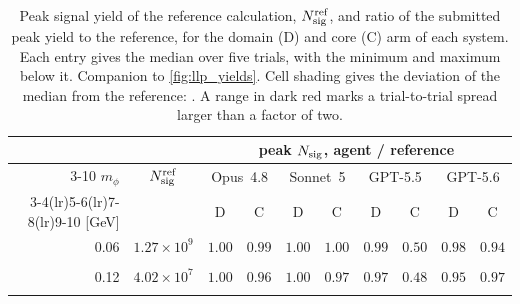 \begin{table}[H]
\centering
\small
\setlength{\tabcolsep}{3pt}
\caption{Peak signal yield of the reference calculation, $N_{\rm sig}^{\rm ref}$, and ratio of the submitted peak yield to the reference, for the domain (D) and core (C) arm of each system. Each entry gives the median over five trials, with the minimum and maximum below it. Companion to \cref{fig:llp_yields}. Cell shading gives the deviation of the median from the reference: \protect\llpkey. A range in dark red marks a trial-to-trial spread larger than a factor of two.}
\label{tab:llp_yields}
\begin{tabular}{rc*{8}{c}}
\toprule
& & \multicolumn{8}{c}{peak $N_{\rm sig}$, agent / reference} \\
\cmidrule(lr){3-10}
$m_\phi$ & $N_{\rm sig}^{\rm ref}$ & \multicolumn{2}{c}{Opus~4.8} & \multicolumn{2}{c}{Sonnet~5} & \multicolumn{2}{c}{GPT-5.5} & \multicolumn{2}{c}{GPT-5.6} \\
\cmidrule(lr){3-4}\cmidrule(lr){5-6}\cmidrule(lr){7-8}\cmidrule(lr){9-10}
[GeV] & & D & C & D & C & D & C & D & C \\
\midrule
0.06 & $1.27\times10^{9}$ & \cellcolor{llpA}$1.00$ & \cellcolor{llpA}$0.99$ & \cellcolor{llpA}$1.00$ & \cellcolor{llpA}$1.00$ & \cellcolor{llpA}$0.99$ & \cellcolor{llpD}$0.50$ & \cellcolor{llpA}$0.98$ & \cellcolor{llpB}$0.94$ \\
& & \cellcolor{llpA}{\scriptsize$[0.98,\,1.01]$} & \cellcolor{llpA}{\color{llpSpread}{\scriptsize$[0.98,\,56]$}} & \cellcolor{llpA}{\scriptsize$[0.89,\,1.00]$} & \cellcolor{llpA}{\color{llpSpread}{\scriptsize$[0.18,\,1.33]$}} & \cellcolor{llpA}{\scriptsize$[0.98,\,1.01]$} & \cellcolor{llpD}{\color{llpSpread}{\scriptsize$[0.0047,\,22]$}} & \cellcolor{llpA}{\scriptsize$[0.96,\,1.00]$} & \cellcolor{llpB}{\color{llpSpread}{\scriptsize$[0.61,\,1.54]$}} \\[2pt]
0.12 & $4.02\times10^{7}$ & \cellcolor{llpA}$1.00$ & \cellcolor{llpA}$0.96$ & \cellcolor{llpA}$1.00$ & \cellcolor{llpA}$0.97$ & \cellcolor{llpA}$0.97$ & \cellcolor{llpD}$0.48$ & \cellcolor{llpB}$0.95$ & \cellcolor{llpA}$0.97$ \\
& & \cellcolor{llpA}{\scriptsize$[0.96,\,1.00]$} & \cellcolor{llpA}{\color{llpSpread}{\scriptsize$[0.94,\,54]$}} & \cellcolor{llpA}{\scriptsize$[0.98,\,1.01]$} & \cellcolor{llpA}{\color{llpSpread}{\scriptsize$[0.12,\,1.38]$}} & \cellcolor{llpA}{\scriptsize$[0.968,\,0.974]$} & \cellcolor{llpD}{\color{llpSpread}{\scriptsize$[0.019,\,21]$}} & \cellcolor{llpB}{\scriptsize$[0.94,\,0.98]$} & \cellcolor{llpA}{\color{llpSpread}{\scriptsize$[0.56,\,1.53]$}} \\[2pt]

\end{tabular}
\end{table}
